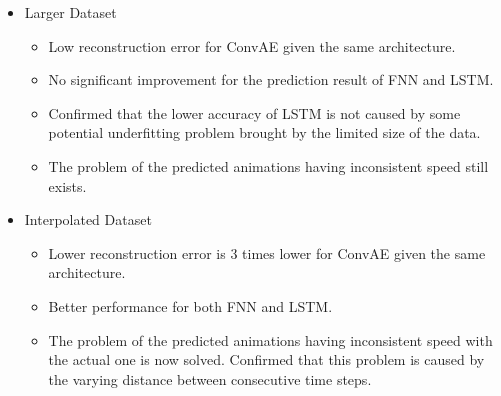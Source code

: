 {\begin{itemize}
\begin{itemize}
\begin{itemize}
                \item while the second method mostly matches with the actual output even in its worst case.

            \end{itemize}

            \item LSTM has a higher loss value than FNN, but is able to capture the characteristic of the simulation more precisely.

            \item predicted animations generated by FNN and LSTM are either moving faster or slower than the actual simulations.

        \end{itemize}

    \item Larger Dataset
        \begin{itemize}
            \item Low reconstruction error for ConvAE given the same architecture.

            \item No significant improvement for the prediction result of FNN and LSTM.

            \item Confirmed that the lower accuracy of LSTM is not caused by some potential underfitting problem brought by the limited size of the data.

            \item The problem of the predicted animations having inconsistent speed still exists.

        \end{itemize}


    \item Interpolated Dataset

    \begin{itemize}
            \item Lower reconstruction error is 3 times lower for ConvAE given the same architecture.

            \item Better performance for both FNN and LSTM.

            \item The problem of the predicted animations having inconsistent speed with the actual one is now solved. Confirmed that this problem is caused by the varying distance between consecutive time steps.

    \end{itemize}


\end{itemize}}
